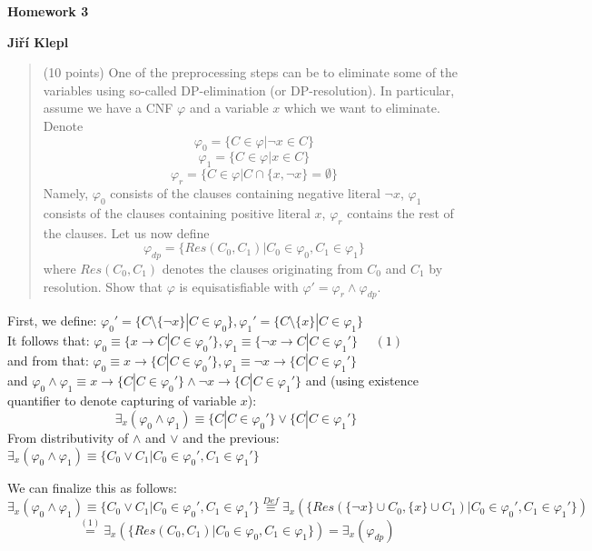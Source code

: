 \documentclass[a4paper,12pt]{article} %
\begin{document}
\begin{center}
    {\Large \bf Homework 3}
    \vspace{2mm}

    {\bf Jiří Klepl}

\end{center}

\vspace{0.4cm}

\begin{quote}
    (10 points) One of the preprocessing steps can be to eliminate some of the variables using so-called
DP-elimination (or DP-resolution). In particular, assume we have a CNF $\varphi$ and a variable $x$ which we want to eliminate. Denote
$$\varphi_0 = \{C \in \varphi | \neg x \in C\}$$
$$\varphi_1 = \{C \in \varphi | x \in C\}$$
$$\varphi_r = \{C \in \varphi | C \cap \{x, \neg x\} = \emptyset\}$$
Namely, $\varphi_0$ consists of the clauses containing negative literal $\neg x$, $\varphi_1$ consists of the clauses containing
positive literal $x$, $\varphi_r$ contains the rest of the clauses. Let us now define
$$\varphi_{dp} = \{Res(C_0, C_1) | C_0 \in \varphi_0, C_1 \in \varphi_1\}$$
where $Res(C_0, C_1)$ denotes the clauses originating from $C_0$ and $C_1$ by resolution. Show that $\varphi$ is equisatisfiable with $\varphi' = \varphi_r \wedge \varphi_{dp}$.
\end{quote}

First, we define: $\varphi_0' = \{C \setminus \{\neg x\} | C \in \varphi_0\}, \varphi_1' = \{C \setminus \{x\} | C \in \varphi_1\}$ \\
It follows that: $\varphi_0 \equiv \{x \to C  | C \in \varphi_0'\}, \varphi_1 \equiv \{\neg x \to C | C \in \varphi_1'\}$ $\quad \left(1\right)$\\
and from that: $\varphi_0 \equiv x \to \{C  | C \in \varphi_0'\}, \varphi_1 \equiv \neg x \to \{C  | C \in \varphi_1'\}$ \\
and $\varphi_0 \wedge \varphi_1 \equiv x \to \{C  | C \in \varphi_0'\} \wedge \neg x \to \{C  | C \in \varphi_1'\}$
and (using existence quantifier to denote capturing of variable $x$):
$$\exists_x (\varphi_0 \wedge \varphi_1) \equiv \{C  | C \in \varphi_0'\} \vee \{C  | C \in \varphi_1'\}$$
From distributivity of $\wedge$ and $\vee$ and the previous: $\exists_x (\varphi_0 \wedge \varphi_1) \equiv \{C_0 \vee C_1 | C_0 \in \varphi_0', C_1 \in \varphi_1'\}$

We can finalize this as follows: $$\exists_x (\varphi_0 \wedge \varphi_1) \equiv \{C_0 \vee C_1 | C_0 \in \varphi_0', C_1 \in \varphi_1'\} \overset{Def}{\equiv} \exists_x (\{Res(\{\neg x\} \cup C_0, \{x\} \cup C_1) | C_0 \in \varphi_0', C_1 \in \varphi_1'\})$$
$$\overset{\left(1\right)}{=} \exists_x (\{Res(C_0, C_1) | C_0 \in \varphi_0, C_1 \in \varphi_1\}) = \exists_x (\varphi_{dp})$$
\end{document}
